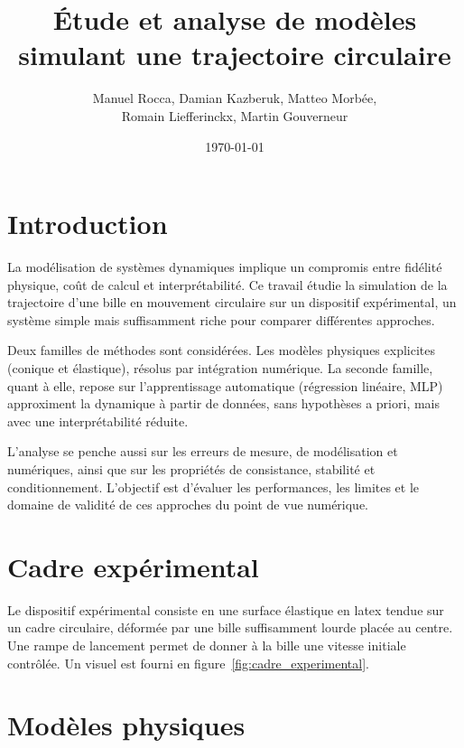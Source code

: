 \documentclass[
	a4paper, %
	10pt, %
	unnumberedsections, %
	twoside, %
]{LTJournalArticle}
\title{Étude et analyse de modèles simulant une trajectoire circulaire} %
\author{%
	Manuel Rocca, Damian Kazberuk, Matteo Morbée,\\
	Romain Liefferinckx, Martin Gouverneur
}
\date{\today}
\begin{document}
\maketitle %


\section{Introduction}

La modélisation de systèmes dynamiques implique un compromis entre
fidélité physique, coût de calcul et interprétabilité. Ce travail étudie
la simulation de la trajectoire d’une bille en mouvement circulaire sur
un dispositif expérimental, un système simple mais suffisamment riche
pour comparer différentes approches.

Deux familles de méthodes sont considérées. Les modèles physiques
explicites (conique et élastique), résolus par intégration numérique.
La seconde famille, quant à elle, repose sur l'apprentissage automatique (régression
linéaire, MLP) approximent la dynamique à partir de données, sans
hypothèses a priori, mais avec une interprétabilité réduite.

L’analyse se penche aussi sur les erreurs de mesure, de modélisation et numériques,
ainsi que sur les propriétés de consistance, stabilité et conditionnement.
L’objectif est d’évaluer les performances, les limites et le domaine de
validité de ces approches du point de vue numérique.


\section{Cadre expérimental}
Le dispositif expérimental consiste en une surface élastique en latex tendue sur un cadre circulaire, déformée par une bille suffisamment lourde placée au centre.
Une rampe de lancement permet de donner à la bille une vitesse initiale contrôlée.
Un visuel est fourni en figure~\ref{fig:cadre_experimental}.


\section{Modèles physiques}
\end{document}
